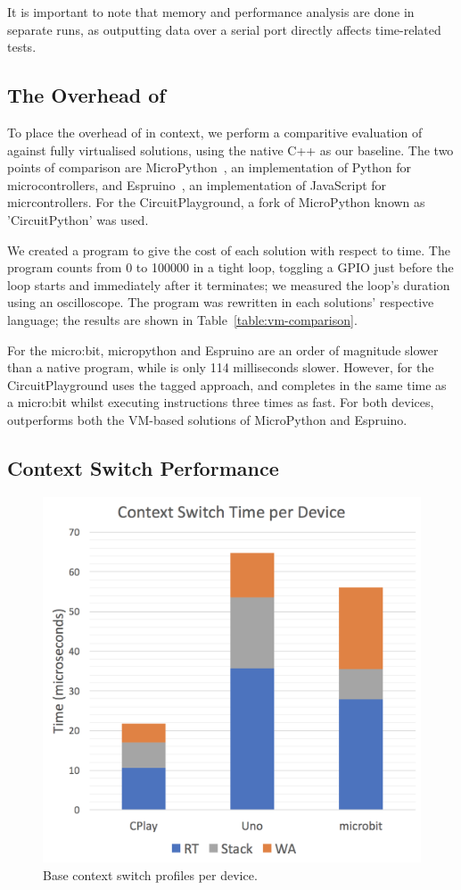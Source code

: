 It is important to note that memory and performance analysis are done in separate runs, as outputting data over a serial port directly affects time-related tests.

\subsection{The Overhead of \MC}

To place the overhead of \MC in context, we perform a comparitive evaluation of \MC against fully virtualised solutions, using the native C++ as our baseline. The two points of comparison are MicroPython~\cite{MicroPython}, an implementation of Python for microcontrollers, and Espruino~\cite{espruinoBook}, an implementation of JavaScript for micrcontrollers. For the CircuitPlayground, a fork of MicroPython  known as 'CircuitPython' was used.

We created a program to give the cost of each solution with respect to time. The program counts from 0 to 100000 in a tight loop, toggling a GPIO just before the loop starts and immediately after it terminates; we measured the loop's duration using an oscilloscope. The program was rewritten in each solutions' respective language; the results are shown in Table~\ref{table:vm-comparison}.

For the micro:bit, micropython and Espruino are an order of magnitude slower than a native \CO program, while \MC is only 114 milliseconds slower. However, \MC for the CircuitPlayground uses the tagged approach, and completes in the same time as a micro:bit whilst executing instructions three times as fast. For both devices, \MC outperforms both the VM-based solutions of MicroPython and Espruino.

\subsection{Context Switch Performance}

\begin{figure}[ht]
    \includegraphics[width=.7\columnwidth]{images/context-switch.png}
\caption{\label{fig:context-switch}Base context switch profiles per device.}
\end{figure}

